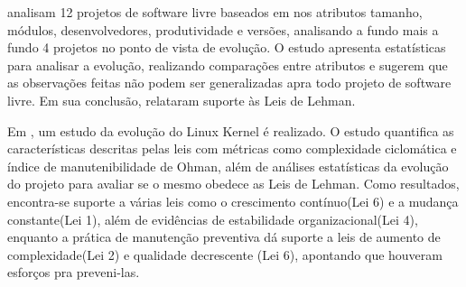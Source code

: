 \cite{carver2004impact} analisam 12 projetos de software livre baseados em nos atributos tamanho, módulos, desenvolvedores, produtividade e versões, analisando a fundo mais a fundo 4 projetos no ponto de vista de evolução. O estudo apresenta estatísticas para analisar a evolução, realizando comparações entre atributos e sugerem que as observações feitas não podem ser generalizadas apra todo projeto de software livre. Em sua conclusão, relataram suporte às Leis de Lehman.

Em \cite{israeli2010linux}, um estudo da evolução do Linux Kernel é realizado. O estudo quantifica as características descritas pelas leis com métricas como complexidade ciclomática e índice de manutenibilidade de Ohman, além de análises estatísticas da evolução do projeto para avaliar se o mesmo obedece as Leis de Lehman. Como resultados, encontra-se suporte a várias leis como o crescimento contínuo(Lei 6) e a mudança constante(Lei 1), além de evidências de estabilidade organizacional(Lei 4), enquanto a prática de manutenção preventiva dá suporte a leis de aumento de complexidade(Lei 2) e qualidade decrescente (Lei 6), apontando que houveram esforços pra preveni-las. 


